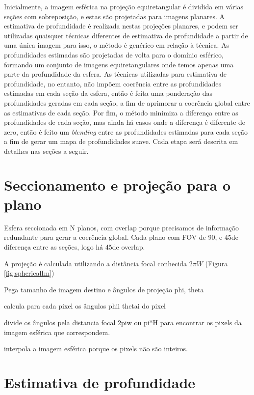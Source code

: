 \documentclass[cic,tc]{iiufrgs}
\begin{document}
Inicialmente, a imagem esférica na projeção equiretangular é dividida em várias seções com sobreposição, e estas são projetadas para imagens planares. A estimativa de profundidade é realizada nestas projeções planares, e podem ser utilizadas quaisquer técnicas diferentes de estimativa de profundidade a partir de uma única imagem para isso, o método é genérico em relação à técnica. As profundidades estimadas são projetadas de volta para o domínio esférico, formando um conjunto de imagens equiretangulares onde temos apenas uma parte da profundidade da esfera. As técnicas utilizadas para estimativa de profundidade, no entanto, não impõem coerência entre as profundidades estimadas em cada seção da esfera, então é feita uma ponderação das profundidades geradas em cada seção, a fim de aprimorar a coerência global entre as estimativas de cada seção. Por fim, o método minimiza a diferença entre as profundidades de cada seção, mas ainda há casos onde a diferença é diferente de zero, então é feito um \textit{blending} entre as profundidades estimadas para cada seção a fim de gerar um mapa de profundidades suave. Cada etapa será descrita em detalhes nas seções a seguir.

\section{Seccionamento e projeção para o plano}

Esfera seccionada em N planos, com overlap porque precisamos de informação redundante para gerar a coerência global. Cada plano com FOV de 90\degree, e 45\degree de diferença entre as seções, logo há 45\degree de overlap.

A projeção é calculada utilizando a distância focal conhecida $2\pi W$ (Figura \ref{fig:sphericalIm})

Pega tamanho de imagem destino e ângulos de projeção phi, theta

calcula para cada pixel os ângulos phii thetai do pixel

divide os ângulos pela distancia focal 2piw ou pi*H para encontrar os pixels da imagem esférica que correspondem.

interpola a imagem esférica porque os pixels não são inteiros.



\section{Estimativa de profundidade}
\end{document}
